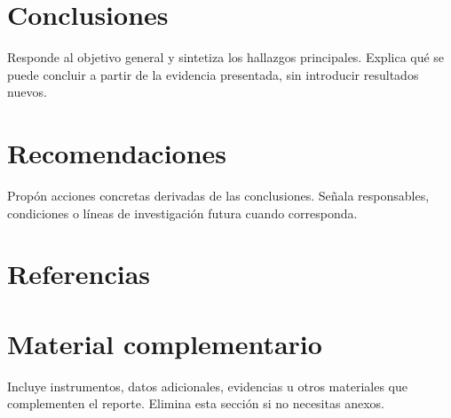\documentclass[12pt,letterpaper]{article}
\begin{document}



\section{Conclusiones}
Responde al objetivo general y sintetiza los hallazgos principales. Explica
qué se puede concluir a partir de la evidencia presentada, sin introducir
resultados nuevos.

\section{Recomendaciones}
Propón acciones concretas derivadas de las conclusiones. Señala responsables,
condiciones o líneas de investigación futura cuando corresponda.

\clearpage
{}
{}
\section*{Referencias}
\begin{doublespace}

\end{doublespace}

\clearpage
\appendix
\section{Material complementario}
Incluye instrumentos, datos adicionales, evidencias u otros materiales que
complementen el reporte. Elimina esta sección si no necesitas anexos.

\firmareporte
\end{document}
